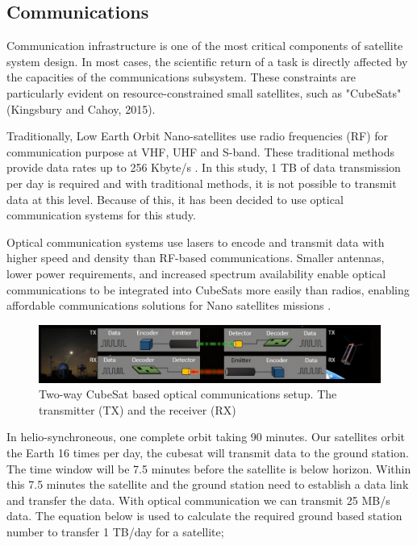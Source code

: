 \documentclass{scrartcl}
\begin{document}
\subsection{Communications}
\label{sec:orgf581e5f}

Communication infrastructure is one of the most critical components of
satellite system design. In most cases, the scientific return of a task
is directly affected by the capacities of the communications subsystem.
These constraints are particularly evident on resource-constrained small
satellites, such as "CubeSats" (Kingsbury and Cahoy, 2015).

Traditionally, Low Earth Orbit Nano-satellites use radio frequencies
(RF) for communication purpose at VHF, UHF and S-band. These traditional
methods provide data rates up to 256 Kbyte/s \citep{ochoa}. In this
study, 1 TB of data transmission per day is required and with
traditional methods, it is not possible to transmit data at this level.
Because of this, it has been decided to use optical communication
systems for this study.

Optical communication systems use lasers to encode and transmit data
with higher speed and density than RF-based communications. Smaller
antennas, lower power requirements, and increased spectrum availability
enable optical communications to be integrated into CubeSats more easily
than radios, enabling affordable communications solutions for Nano
satellites missions \citep{nasa_cube}.

\begin{figure}[hbpt]
\centering
\includegraphics[width=0.8\linewidth]{img/eng_fig_3.png}
 \caption{Two-way CubeSat based optical communications setup. The
 transmitter (TX) and the receiver (RX) \citep{nasa_cube}}
\end{figure}

In helio-synchroneous, one complete orbit taking 90 minutes. Our
satellites orbit the Earth 16 times per day, the cubesat will transmit
data to the ground station. The time window will be 7.5 minutes before
the satellite is below horizon. Within this 7.5 minutes the satellite
and the ground station need to establish a data link and transfer the
data. With optical communication we can transmit 25 MB/s data. The
equation below is used to calculate the required ground based station
number to transfer 1 TB/day for a satellite;
\end{document}
